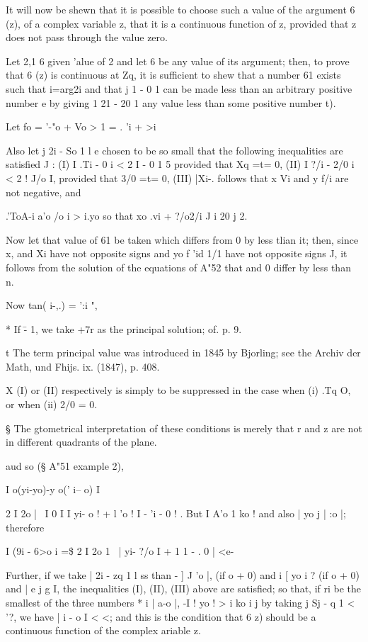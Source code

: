 It will now be shewn that it is possible to choose such a value of the
argument 6 (z), of a complex variable z, that it is a continuous
function of z, provided that z does not pass through the value zero.

Let 2,1 6 given 'alue of 2 and let 6 be any value of its argument;
then, to prove that 6 (z) is continuous at Zq, it is sufficient to
shew that a number 61 exists such that i=arg2i and that j 1 - 0 1 can
be made less than an arbitrary positive number e by giving 1 21 - 20 1
any value less than some positive number t).

Let fo = '-"o + Vo > 1 = . 'i + >i 

Also let j 2i - So 1 l e chosen to be so small that the following
inequalities are satisfied J : (I) I .Ti - 0 i < 2 I - 0 1 5 provided
that Xq =t= 0, (II) I ?/i - 2/0 i < 2 ! J/o I, provided that 3/0 =t=
0, (III) |Xi-.%
follows that x Vi and y f/i are not negative, and

.'ToA-i a'o /o i > i.yo so that xo .vi + ?/o2/i J i 20 j 2.

Now let that value of 61 be taken which differs from 0 by less tlian
it; then, since x, and Xi have not opposite signs and yo f 'id 1/1
have not opposite signs J, it follows from the solution of the
equations of A"52 that and 0 differ by less than n.

Now tan( i-,.) = ':i ",

* If \= - 1, we take +7r as the principal solution; of. p. 9.

t The term principal value was introduced in 1845 by Bjorling; see
the Archiv der Math, und Fhijs. ix. (1847), p. 408.

X (I) or (II) respectively is simply to be suppressed in the case when
(i) .Tq O, or when (ii) 2/0 = 0.

§ The gtometrical interpretation of these conditions is merely that r
and z are not in different quadrants of the plane.

%
%
aud so (§ A"51
example 2),

  I o(yi-yo)-y o(' i-- o) I

  2 I 2o |~ I 0 I  I yi- o ! + l 'o !  I - 'i - 0 ! . But I A'o 1 ko
! and also | yo j | :o |; therefore

I (9i - 6>o i =\$ 2 I 2o 1~ | yi- ?/o I + 1 1 - . 0 | <e-

Further, if we take | 2i - zq 1 l ss than  - ] J 'o |, (if o + 0)
and i [ yo i ? (if o + 0) and | e j g I, the inequalities (I), (II),
(III) above are satisfied; so that, if ri be the smallest of the
three numbers * i | a-o |, -I ! yo ! > i ko i j by taking j Sj - q 1
< '?, we have | i - o I < <; and this is the condition that 6 z)
should be a continuous function of the complex ariable z.

